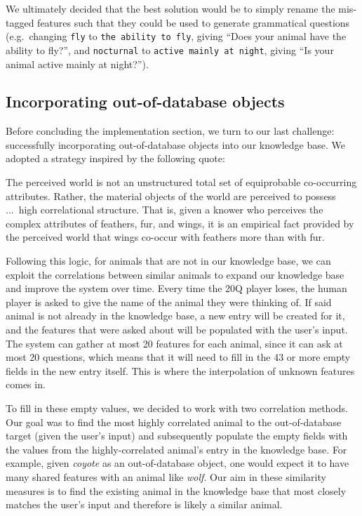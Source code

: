 \documentclass[11pt,a4paper]{article}
\begin{document}
We ultimately decided that the best solution would be to simply rename the mis-tagged features such that they could be used to generate grammatical questions (e.g.\ changing \texttt{fly} to \texttt{the ability to fly}, giving ``Does your animal have the ability to fly?'', and \texttt{nocturnal} to \texttt{active mainly at night}, giving ``Is your animal active mainly at night?'').

\subsection{Incorporating out-of-database objects}
\label{subsec:out-of-db}

Before concluding the implementation section, we turn to our last challenge: successfully incorporating out-of-database objects into our knowledge base. 
We adopted a strategy inspired by the following quote:

\begin{displayquote}
The perceived world is not an unstructured total set of equiprobable co-occurring attributes. 
Rather, the material objects of the world are perceived to possess ...\ high correlational structure.
That is, given a knower who perceives the complex attributes of feathers, fur, and wings, it is an empirical fact provided by the perceived world that wings co-occur with feathers more than with fur. \citep[29]{Rosch1978}
\end{displayquote}

Following this logic, for animals that are not in our knowledge base, we can exploit the correlations between similar animals to expand our knowledge base and improve the system over time.
Every time the 20Q player loses, the human player is asked to give the name of the animal they were thinking of. 
If said animal is not already in the knowledge base, a new entry will be created for it, and the features that were asked about will be populated with the user's input. 
The system can gather at most 20 features for each animal, since it can ask at most 20 questions, which means that it will need to fill in the 43 or more empty fields in the new entry itself.
This is where the interpolation of unknown features comes in.

To fill in these empty values, we decided to work with two correlation methods. 
Our goal was to find the most highly correlated animal to the out-of-database target (given the user's input) and subsequently populate the empty fields with the values from the highly-correlated animal's entry in the knowledge base. 
For example, given \textit{coyote} as an out-of-database object, one would expect it to have many shared features with an animal like \textit{wolf}. 
Our aim in these similarity measures is to find the existing animal in the knowledge base that most closely matches the user's input and therefore is likely a similar animal.
\end{document}
